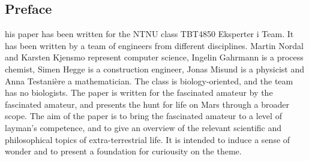 \subsection{Preface}
his paper has been written for the NTNU class TBT4850 Eksperter i Team.
It has been written by a team of engineers from different disciplines.
Martin Nordal and Karsten Kjensmo represent computer science, Ingelin Gahrmann is a process chemist, Simen Hegge is a construction engineer, Jonas Misund is a physicist and Anna Testani\`{e}re a mathematician.
The class is biology-oriented, and the team has no biologists.
The paper is written for the fascinated amateur by the fascinated amateur, and presents the hunt for life on Mars through a broader scope.
The aim of the paper is to bring the fascinated amateur to a level of layman's competence, and to give an overview of the relevant scientific and philosophical topics of extra-terrestrial life.
It is intended to induce a sense of wonder and to present a foundation for curiousity on the theme.